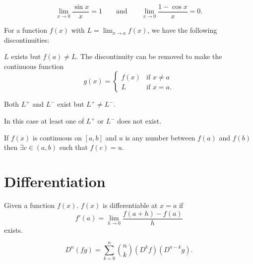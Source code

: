 \documentclass[10pt, a4paper]{article}
\begin{document}
\begin{proposition}
    \[
    \lim_{x \rightarrow 0}\frac{\sin{x}}{x} = 1\qquad\text{and}\qquad\lim_{x \rightarrow 0}\frac{1 - \cos{x}}{x} = 0.
    \]
\end{proposition}

For a function $f(x)$ with $L = \lim_{x \rightarrow a}f(x)$,
we have the following discontinuities:

\begin{definition}
    $L$ exists but $f(a) \neq L$.
    The discontinuity can be removed to make the continuous function
    \[
    g(x) = \begin{cases}
        f(x) & \text{if } x \neq a \\
        L & \text{if } x = a.
    \end{cases}
    \]
\end{definition}

\begin{definition}
    Both $L ^ {+}$ and $L ^ {-}$ exist but $L ^ {+} \neq L ^ {-}$.
\end{definition}

\begin{definition}
    In this case at least one of $L ^ {+}$ or $L ^ {-}$ does not exist.
\end{definition}

\begin{theorem}
    If $f(x)$ is continuous on $[a, b]$ and $u$ is any number between $f(a)$ and $f(b)$ then $\exists c \in (a, b)$ such that $f(c) = u$.
\end{theorem}

\newpage

\section{Differentiation}

\begin{definition}
    Given a function $f(x)$.
    $f(x)$ is differentiable at $x = a$ if
    \[
    f'(a) = \lim_{h \rightarrow 0}\frac{f(a + h) - f(a)}{h}
    \]
    exists.
\end{definition}

\begin{proposition}
    \[
    D ^ n(fg) = \sum_{k = 0}^{n}\binom{n}{k}(D ^ kf)(D ^ {n - k}g).
    \]
\end{proposition}
\end{document}
